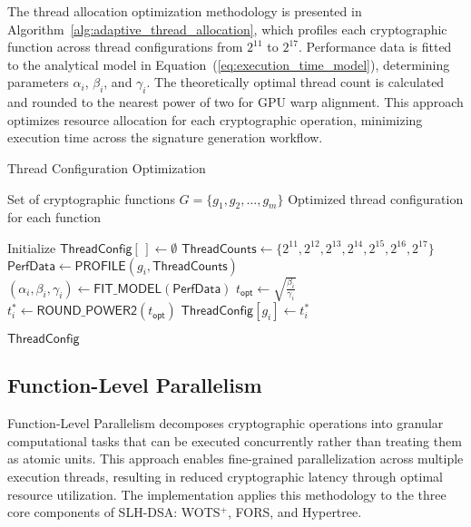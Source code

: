 \documentclass[journal]{IEEEtran}
\begin{document}
\color{blue}
The thread allocation optimization methodology is presented in Algorithm~\ref{alg:adaptive_thread_allocation}, which profiles each cryptographic function across thread configurations from $2^{11}$ to $2^{17}$. Performance data is fitted to the analytical model in Equation~(\ref{eq:execution_time_model}), determining parameters $\alpha_i$, $\beta_i$, and $\gamma_i$. The theoretically optimal thread count is calculated and rounded to the nearest power of two for GPU warp alignment. This approach optimizes resource allocation for each cryptographic operation, minimizing execution time across the signature generation workflow.
\color{black}

\begin{algorithm}
  \caption{Thread Configuration Optimization}
  \label{alg:adaptive_thread_allocation}
  \color{blue}
  \begin{algorithmic}[1]
    \REQUIRE Set of cryptographic functions $G = \{g_1, g_2, \ldots, g_m\}$
    \ENSURE Optimized thread configuration for each function

    \STATE Initialize $\textsf{ThreadConfig}[\,] \gets \emptyset$
    \STATE $\textsf{ThreadCounts} \gets \{2^{11}, 2^{12}, 2^{13}, 2^{14}, 2^{15}, 2^{16}, 2^{17}\}$
    \STATE $\textsf{PerfData} \gets \textsf{PROFILE}(g_i, \textsf{ThreadCounts})$
    \STATE $(\alpha_i, \beta_i, \gamma_i) \gets \textsf{FIT\_MODEL}(\textsf{PerfData})$
    \STATE $t_{\textsf{opt}} \gets \sqrt{\frac{\beta_i}{\gamma_i}}$
    \STATE $t_i^* \gets \textsf{ROUND\_POWER2}(t_{\textsf{opt}})$
    \STATE $\textsf{ThreadConfig}[g_i] \gets t_i^*$
    \ENDFOR

    \RETURN $\textsf{ThreadConfig}$
  \end{algorithmic}
\end{algorithm}

\subsection{Function-Level Parallelism}

\color{blue}

Function-Level Parallelism  decomposes cryptographic operations into granular computational tasks that can be executed concurrently rather than treating them as atomic units. This approach enables fine-grained parallelization across multiple execution threads, resulting in reduced cryptographic latency through optimal resource utilization. The implementation applies this methodology to the three core components of SLH-DSA: WOTS$^+$, FORS, and Hypertree.
\end{document}
